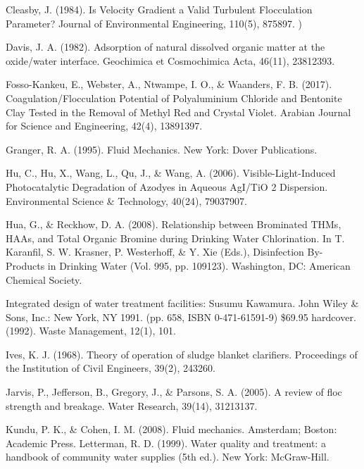 \documentclass[letterpaper,10pt,english]{sphinxmanual}
\begin{document}
Cleasby, J. (1984). Is Velocity Gradient a Valid Turbulent Flocculation Parameter? Journal of Environmental Engineering, 110(5), 875\textendash{}897. )

Davis, J. A. (1982). Adsorption of natural dissolved organic matter at the oxide/water interface. Geochimica et Cosmochimica Acta, 46(11), 2381\textendash{}2393. 

Fosso-Kankeu, E., Webster, A., Ntwampe, I. O., \& Waanders, F. B. (2017). Coagulation/Flocculation Potential of Polyaluminium Chloride and Bentonite Clay Tested in the Removal of Methyl Red and Crystal Violet. Arabian Journal for Science and Engineering, 42(4), 1389\textendash{}1397. 

Granger, R. A. (1995). Fluid Mechanics. New York: Dover Publications.

Hu, C., Hu, X., Wang, L., Qu, J., \& Wang, A. (2006). Visible-Light-Induced Photocatalytic Degradation of Azodyes in Aqueous AgI/TiO 2 Dispersion. Environmental Science \& Technology, 40(24), 7903\textendash{}7907. 

Hua, G., \& Reckhow, D. A. (2008). Relationship between Brominated THMs, HAAs, and Total Organic Bromine during Drinking Water Chlorination. In T. Karanfil, S. W. Krasner, P. Westerhoff, \& Y. Xie (Eds.), Disinfection By-Products in Drinking Water (Vol. 995, pp. 109\textendash{}123). Washington, DC: American Chemical Society. 

Integrated design of water treatment facilities: Susumu Kawamura. John Wiley \& Sons, Inc.: New York, NY 1991. (pp. 658, ISBN 0-471-61591-9) \$69.95 hardcover. (1992). Waste Management, 12(1), 101. 

Ives, K. J. (1968). Theory of operation of sludge blanket clarifiers. Proceedings of the Institution of Civil Engineers, 39(2), 243\textendash{}260. 

Jarvis, P., Jefferson, B., Gregory, J., \& Parsons, S. A. (2005). A review of floc strength and breakage. Water Research, 39(14), 3121\textendash{}3137. 

Kundu, P. K., \& Cohen, I. M. (2008). Fluid mechanics. Amsterdam; Boston: Academic Press.
Letterman, R. D. (1999). Water quality and treatment: a handbook of community water supplies (5th ed.). New York: McGraw-Hill.
\end{document}
